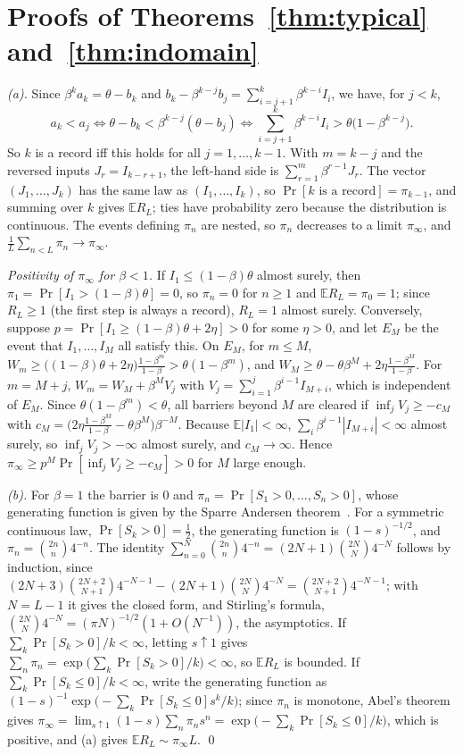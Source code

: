 \documentclass[10pt]{article}
\theoremstyle{remark}
\begin{document}
\section{Proofs of Theorems~\ref{thm:typical} and~\ref{thm:indomain}}
\label{app:typical}

\emph{(a).} Since $\beta^ka_k=\theta-b_k$ and $b_k-\beta^{k-j}b_j=\sum_{i=j+1}^k\beta^{k-i}I_i$, we have, for $j<k$,
\[a_k<a_j\iff\theta-b_k<\beta^{k-j}(\theta-b_j)\iff\sum_{i=j+1}^k\beta^{k-i}I_i>\theta\big(1-\beta^{k-j}\big).\]
So $k$ is a record iff this holds for all $j=1,\dots,k-1$. With $m=k-j$ and the reversed inputs $J_r=I_{k-r+1}$, the left-hand side is $\sum_{r=1}^m\beta^{r-1}J_r$. The vector $(J_1,\dots,J_k)$ has the same law as $(I_1,\dots,I_k)$, so $\Pr[k\text{ is a record}]=\pi_{k-1}$, and summing over $k$ gives $\mathbb E R_L$; ties have probability zero because the distribution is continuous. The events defining $\pi_n$ are nested, so $\pi_n$ decreases to a limit $\pi_\infty$, and $\frac1L\sum_{n<L}\pi_n\to\pi_\infty$.

\emph{Positivity of $\pi_\infty$ for $\beta<1$.} If $I_1\le(1-\beta)\theta$ almost surely, then $\pi_1=\Pr[I_1>(1-\beta)\theta]=0$, so $\pi_n=0$ for $n\ge1$ and $\mathbb ER_L=\pi_0=1$; since $R_L\ge1$ (the first step is always a record), $R_L=1$ almost surely. Conversely, suppose $p=\Pr[I_1\ge(1-\beta)\theta+2\eta]>0$ for some $\eta>0$, and let $E_M$ be the event that $I_1,\dots,I_M$ all satisfy this. On $E_M$, for $m\le M$, $W_m\ge\big((1-\beta)\theta+2\eta\big)\frac{1-\beta^m}{1-\beta}>\theta(1-\beta^m)$, and $W_M\ge\theta-\theta\beta^M+2\eta\frac{1-\beta^M}{1-\beta}$. For $m=M+j$, $W_m=W_M+\beta^MV_j$ with $V_j=\sum_{i=1}^j\beta^{i-1}I_{M+i}$, which is independent of $E_M$. Since $\theta(1-\beta^m)<\theta$, all barriers beyond $M$ are cleared if $\inf_jV_j\ge-c_M$ with $c_M=\big(2\eta\frac{1-\beta^M}{1-\beta}-\theta\beta^M\big)\beta^{-M}$. Because $\mathbb E|I_1|<\infty$, $\sum_i\beta^{i-1}|I_{M+i}|<\infty$ almost surely, so $\inf_jV_j>-\infty$ almost surely, and $c_M\to\infty$. Hence $\pi_\infty\ge p^M\Pr[\inf_jV_j\ge-c_M]>0$ for $M$ large enough.

\emph{(b).} For $\beta=1$ the barrier is $0$ and $\pi_n=\Pr[S_1>0,\dots,S_n>0]$, whose generating function is given by the Sparre Andersen theorem~\citep[][Ch.~XII.7]{sparreandersen1954,feller1971}. For a symmetric continuous law, $\Pr[S_k>0]=\tfrac12$, the generating function is $(1-s)^{-1/2}$, and $\pi_n=\binom{2n}{n}4^{-n}$. The identity $\sum_{n=0}^N\binom{2n}{n}4^{-n}=(2N+1)\binom{2N}{N}4^{-N}$ follows by induction, since $(2N+3)\binom{2N+2}{N+1}4^{-N-1}-(2N+1)\binom{2N}{N}4^{-N}=\binom{2N+2}{N+1}4^{-N-1}$; with $N=L-1$ it gives the closed form, and Stirling's formula, $\binom{2N}{N}4^{-N}=(\pi N)^{-1/2}(1+O(N^{-1}))$, the asymptotics. If $\sum_k\Pr[S_k>0]/k<\infty$, letting $s\uparrow1$ gives $\sum_n\pi_n=\exp\big(\sum_k\Pr[S_k>0]/k\big)<\infty$, so $\mathbb E R_L$ is bounded. If $\sum_k\Pr[S_k\le0]/k<\infty$, write the generating function as $(1-s)^{-1}\exp\big(-\sum_k\Pr[S_k\le0]s^k/k\big)$; since $\pi_n$ is monotone, Abel's theorem gives $\pi_\infty=\lim_{s\uparrow1}(1-s)\sum_n\pi_ns^n=\exp\big(-\sum_k\Pr[S_k\le0]/k\big)$, which is positive, and (a) gives $\mathbb E R_L\sim\pi_\infty L$. \qed
\end{document}
